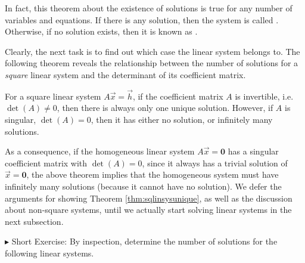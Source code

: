 In fact, this theorem about the existence of solutions is true for any number of variables and equations.\footnotemark{} If there is any solution, then the system is called . Otherwise, if no solution exists, then it is known as .\par

Clearly, the next task is to find out which case the linear system belongs to. The following theorem reveals the relationship between the number of solutions for a \textit{square} linear system and the determinant of its coefficient matrix.
\begin{thm}
\label{thm:sqlinsysunique}
For a square linear system $A\vec{x} = \vec{h}$, if the coefficient matrix $A$ is invertible, i.e.\ $\det(A) \neq 0$, then there is always only one unique solution. However, if $A$ is singular, $\det(A) = 0$, then it has either no solution, or infinitely many solutions.
\end{thm}
As a consequence, if the homogeneous linear system $A\vec{x} = \textbf{0}$ has a singular coefficient matrix with $\det(A) = 0$, since it always has a trivial solution of $\vec{x} = \textbf{0}$, the above theorem implies that the homogeneous system must have infinitely many solutions (because it cannot have no solution). We defer the arguments for showing Theorem \ref{thm:sqlinsysunique}, as well as the discussion about non-square systems, until we actually start solving linear systems in the next subsection. \par
$\blacktriangleright$ Short Exercise: By inspection, determine the number of solutions for the following linear systems.\footnotemark
